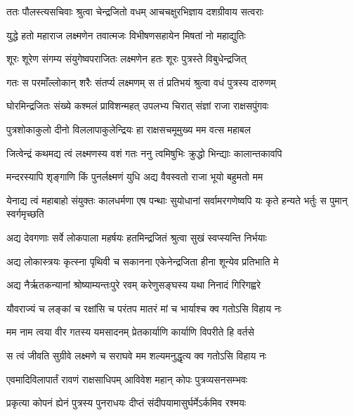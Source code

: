
\twolineshloka
{ततः पौलस्त्यसचिवाः श्रुत्वा चेन्द्रजितो वधम्}
{आचचक्षुरभिज्ञाय दशग्रीवाय सत्वराः} %

\twolineshloka
{युद्धे हतो महाराज लक्ष्मणेन तवात्मजः}
{विभीषणसहायेन मिषतां नो महाद्युतिः} %

\twolineshloka
{शूरः शूरेण संगम्य संयुगेष्वपराजितः}
{लक्ष्मणेन हतः शूरः पुत्रस्ते विबुधेन्द्रजित्} %

\twolineshloka
{गतः स परमाँल्लोकान् शरैः संतर्प्य लक्ष्मणम्}
{स तं प्रतिभयं श्रुत्वा वधं पुत्रस्य दारुणम्} %

\twolineshloka
{घोरमिन्द्रजितः संख्ये कश्मलं प्राविशन्महत्}
{उपलभ्य चिरात् संज्ञां राजा राक्षसपुंगवः} %

\twolineshloka
{पुत्रशोकाकुलो दीनो विललापाकुलेन्द्रियः}
{हा राक्षसचमूमुख्य मम वत्स महाबल} %

\twolineshloka
{जित्वेन्द्रं कथमद्य त्वं लक्ष्मणस्य वशं गतः}
{ननु त्वमिषुभिः क्रुद्धो भिन्द्याः कालान्तकावपि} %

\twolineshloka
{मन्दरस्यापि शृङ्गाणि किं पुनर्लक्ष्मणं युधि}
{अद्य वैवस्वतो राजा भूयो बहुमतो मम} %

\threelineshloka
{येनाद्य त्वं महाबाहो संयुक्तः कालधर्मणा}
{एष पन्थाः सुयोधानां सर्वामरगणेष्वपि}
{यः कृते हन्यते भर्तुः स पुमान् स्वर्गमृच्छति} %

\twolineshloka
{अद्य देवगणाः सर्वे लोकपाला महर्षयः}
{हतमिन्द्रजितं श्रुत्वा सुखं स्वप्स्यन्ति निर्भयाः} %

\twolineshloka
{अद्य लोकास्त्रयः कृत्स्ना पृथिवी च सकानना}
{एकेनेन्द्रजिता हीना शून्येव प्रतिभाति मे} %

\twolineshloka
{अद्य नैर्ऋतकन्यानां श्रोष्याम्यन्तःपुरे रवम्}
{करेणुसङ्घस्य यथा निनादं गिरिगह्वरे} %

\twolineshloka
{यौवराज्यं च लङ्कां च रक्षांसि च परंतप}
{मातरं मां च भार्याश्च क्व गतोऽसि विहाय नः} %

\twolineshloka
{मम नाम त्वया वीर गतस्य यमसादनम्}
{प्रेतकार्याणि कार्याणि विपरीते हि वर्तसे} %

\twolineshloka
{स त्वं जीवति सुग्रीवे लक्ष्मणे च सराघवे}
{मम शल्यमनुद्धृत्य क्व गतोऽसि विहाय नः} %

\twolineshloka
{एवमादिविलापार्तं रावणं राक्षसाधिपम्}
{आविवेश महान् कोपः पुत्रव्यसनसम्भवः} %

\twolineshloka
{प्रकृत्या कोपनं ह्येनं पुत्रस्य पुनराधयः}
{दीप्तं संदीपयामासुर्घर्मेऽर्कमिव रश्मयः} %

